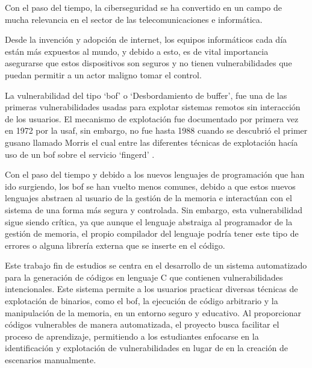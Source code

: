 Con el paso del tiempo, la ciberseguridad se ha convertido en un campo de mucha relevancia
en el sector de las telecomunicaciones e informática.

Desde la invención y adopción de internet, los equipos informáticos cada día están más expuestos
al mundo, y debido a esto, es de vital importancia asegurarse que estos dispositivos son seguros y no tienen vulnerabilidades que puedan permitir a un actor maligno tomar el control.

La vulnerabilidad del tipo `\acrfull{bof}' o `Desbordamiento de buffer', fue una de las primeras vulnerabilidades usadas para explotar sistemas remotos sin interacción de los usuarios. El mecanismo de explotación fue documentado por primera vez en 1972 por la \acrfull{usaf}, sin embargo, no fue hasta 1988 cuando se descubrió el primer gusano llamado Morris \cite{Morris} el cual entre las diferentes técnicas de explotación hacía uso de un \acrshort{bof} sobre el servicio `fingerd' \cite{Fingerd}.

Con el paso del tiempo y debido a los nuevos lenguajes de programación que han ido surgiendo, los \acrshort{bof} se han vuelto menos comunes, debido a que estos nuevos lenguajes abstraen al usuario de la gestión de la memoria e interactúan con el sistema de una forma más segura y controlada. Sin embargo, esta vulnerabilidad sigue siendo crítica, ya que aunque el lenguaje abstraiga al programador de la gestión de memoria, el propio compilador del lenguaje podría tener este tipo de errores o alguna librería externa que se inserte en el código.

Este trabajo fin de estudios se centra en el desarrollo de un sistema automatizado para la generación de códigos en lenguaje C que contienen vulnerabilidades intencionales. Este sistema permite a los usuarios practicar diversas técnicas de explotación de binarios, como el \acrshort{bof}, la ejecución de código arbitrario y la manipulación de la memoria, en un entorno seguro y educativo. Al proporcionar códigos vulnerables de manera automatizada, el proyecto busca facilitar el proceso de aprendizaje, permitiendo a los estudiantes enfocarse en la identificación y explotación de vulnerabilidades en lugar de en la creación de escenarios manualmente.
